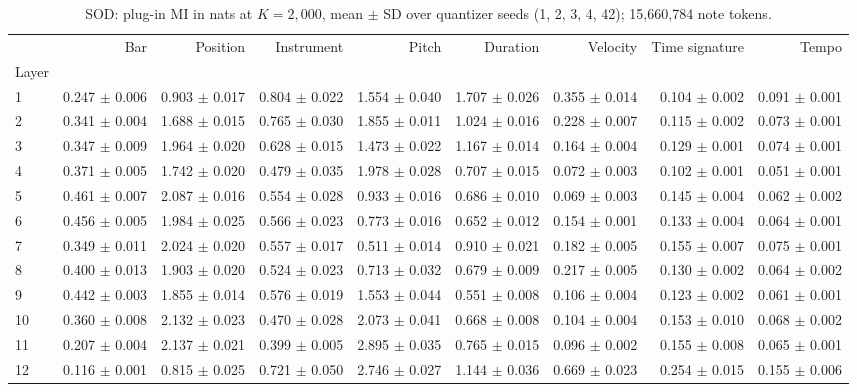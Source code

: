 \documentclass[10pt]{article}
\begin{document}
\begin{table}[h]\centering\scriptsize\setlength{\tabcolsep}{3.5pt}
\caption{SOD: plug-in MI in nats at $K=2,000$, mean $\pm$ SD over quantizer seeds (1, 2, 3, 4, 42); 15,660,784 note tokens.}\label{tab:sod2000}
\begin{tabular}{lrrrrrrrr}
\toprule
 & Bar & Position & Instrument & Pitch & Duration & Velocity & Time signature & Tempo \\
Layer &  &  &  &  &  &  &  &  \\
\midrule
1 & 0.247 $\pm$ 0.006 & 0.903 $\pm$ 0.017 & 0.804 $\pm$ 0.022 & 1.554 $\pm$ 0.040 & 1.707 $\pm$ 0.026 & 0.355 $\pm$ 0.014 & 0.104 $\pm$ 0.002 & 0.091 $\pm$ 0.001 \\
2 & 0.341 $\pm$ 0.004 & 1.688 $\pm$ 0.015 & 0.765 $\pm$ 0.030 & 1.855 $\pm$ 0.011 & 1.024 $\pm$ 0.016 & 0.228 $\pm$ 0.007 & 0.115 $\pm$ 0.002 & 0.073 $\pm$ 0.001 \\
3 & 0.347 $\pm$ 0.009 & 1.964 $\pm$ 0.020 & 0.628 $\pm$ 0.015 & 1.473 $\pm$ 0.022 & 1.167 $\pm$ 0.014 & 0.164 $\pm$ 0.004 & 0.129 $\pm$ 0.001 & 0.074 $\pm$ 0.001 \\
4 & 0.371 $\pm$ 0.005 & 1.742 $\pm$ 0.020 & 0.479 $\pm$ 0.035 & 1.978 $\pm$ 0.028 & 0.707 $\pm$ 0.015 & 0.072 $\pm$ 0.003 & 0.102 $\pm$ 0.001 & 0.051 $\pm$ 0.001 \\
5 & 0.461 $\pm$ 0.007 & 2.087 $\pm$ 0.016 & 0.554 $\pm$ 0.028 & 0.933 $\pm$ 0.016 & 0.686 $\pm$ 0.010 & 0.069 $\pm$ 0.003 & 0.145 $\pm$ 0.004 & 0.062 $\pm$ 0.002 \\
6 & 0.456 $\pm$ 0.005 & 1.984 $\pm$ 0.025 & 0.566 $\pm$ 0.023 & 0.773 $\pm$ 0.016 & 0.652 $\pm$ 0.012 & 0.154 $\pm$ 0.001 & 0.133 $\pm$ 0.004 & 0.064 $\pm$ 0.001 \\
7 & 0.349 $\pm$ 0.011 & 2.024 $\pm$ 0.020 & 0.557 $\pm$ 0.017 & 0.511 $\pm$ 0.014 & 0.910 $\pm$ 0.021 & 0.182 $\pm$ 0.005 & 0.155 $\pm$ 0.007 & 0.075 $\pm$ 0.001 \\
8 & 0.400 $\pm$ 0.013 & 1.903 $\pm$ 0.020 & 0.524 $\pm$ 0.023 & 0.713 $\pm$ 0.032 & 0.679 $\pm$ 0.009 & 0.217 $\pm$ 0.005 & 0.130 $\pm$ 0.002 & 0.064 $\pm$ 0.002 \\
9 & 0.442 $\pm$ 0.003 & 1.855 $\pm$ 0.014 & 0.576 $\pm$ 0.019 & 1.553 $\pm$ 0.044 & 0.551 $\pm$ 0.008 & 0.106 $\pm$ 0.004 & 0.123 $\pm$ 0.002 & 0.061 $\pm$ 0.001 \\
10 & 0.360 $\pm$ 0.008 & 2.132 $\pm$ 0.023 & 0.470 $\pm$ 0.028 & 2.073 $\pm$ 0.041 & 0.668 $\pm$ 0.008 & 0.104 $\pm$ 0.004 & 0.153 $\pm$ 0.010 & 0.068 $\pm$ 0.002 \\
11 & 0.207 $\pm$ 0.004 & 2.137 $\pm$ 0.021 & 0.399 $\pm$ 0.005 & 2.895 $\pm$ 0.035 & 0.765 $\pm$ 0.015 & 0.096 $\pm$ 0.002 & 0.155 $\pm$ 0.008 & 0.065 $\pm$ 0.001 \\
12 & 0.116 $\pm$ 0.001 & 0.815 $\pm$ 0.025 & 0.721 $\pm$ 0.050 & 2.746 $\pm$ 0.027 & 1.144 $\pm$ 0.036 & 0.669 $\pm$ 0.023 & 0.254 $\pm$ 0.015 & 0.155 $\pm$ 0.006 \\
\bottomrule
\end{tabular}
\end{table}
\end{document}
